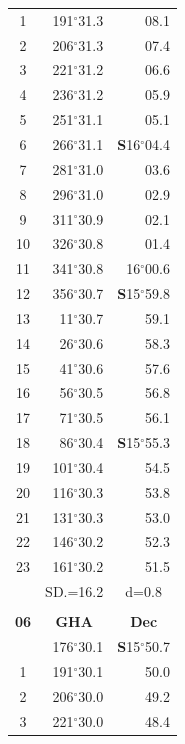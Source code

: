\documentclass[10pt, a4paper]{report}
\begin{document}
\begin{scriptsize}
\begin{tabular*}{0.2\textwidth}[t]{@{\extracolsep{\fill}}|c|rr|}
1 & 191$^\circ$31.3 & 08.1\\
2 & 206$^\circ$31.3 & 07.4\\
3 & 221$^\circ$31.2 & \raisebox{0.24ex}{\boldmath$\cdot$~\boldmath$\cdot$~~}06.6\\
4 & 236$^\circ$31.2 & 05.9\\
5 & 251$^\circ$31.1 & 05.1\\[2Pt]
6 & 266$^\circ$31.1 & \textbf{S}16$^\circ$04.4\\
7 & 281$^\circ$31.0 & 03.6\\
8 & 296$^\circ$31.0 & 02.9\\
9 & 311$^\circ$30.9 & \raisebox{0.24ex}{\boldmath$\cdot$~\boldmath$\cdot$~~}02.1\\
10 & 326$^\circ$30.8 & 01.4\\
11 & 341$^\circ$30.8 & 16$^\circ$00.6\\[2Pt]
12 & 356$^\circ$30.7 & \textbf{S}15$^\circ$59.8\\
13 & 11$^\circ$30.7 & 59.1\\
14 & 26$^\circ$30.6 & 58.3\\
15 & 41$^\circ$30.6 & \raisebox{0.24ex}{\boldmath$\cdot$~\boldmath$\cdot$~~}57.6\\
16 & 56$^\circ$30.5 & 56.8\\
17 & 71$^\circ$30.5 & 56.1\\[2Pt]
18 & 86$^\circ$30.4 & \textbf{S}15$^\circ$55.3\\
19 & 101$^\circ$30.4 & 54.5\\
20 & 116$^\circ$30.3 & 53.8\\
21 & 131$^\circ$30.3 & \raisebox{0.24ex}{\boldmath$\cdot$~\boldmath$\cdot$~~}53.0\\
22 & 146$^\circ$30.2 & 52.3\\
23 & 161$^\circ$30.2 & 51.5\\
\hline
\rule{0pt}{2.4ex} & \multicolumn{1}{c}{SD.=16.2} & \multicolumn{1}{c|}{d=0.8}\\
\hline
\multicolumn{1}{c}{}\\[-0.5ex]\hline
\multicolumn{1}{|c|}{\rule{0pt}{2.6ex}\textbf{06}} & \multicolumn{1}{c}{\textbf{GHA}} & \multicolumn{1}{c|}{\textbf{Dec}}\\
\hline\rule{0pt}{2.6ex}\noindent
0 & 176$^\circ$30.1 & \textbf{S}15$^\circ$50.7\\
1 & 191$^\circ$30.1 & 50.0\\
2 & 206$^\circ$30.0 & 49.2\\
3 & 221$^\circ$30.0 & \raisebox{0.24ex}{\boldmath$\cdot$~\boldmath$\cdot$~~}48.4\\

\end{tabular*}
\end{scriptsize}
\end{document}
